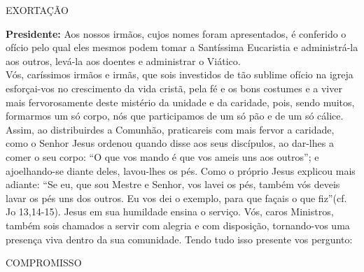 \documentclass{book}
\begin{document}
\begin{center}
    EXORTAÇÃO
    \vspace{.2cm} \\
\end{center}
\begin{flushleft}
    \textbf{Presidente:} Aos nossos irmãos, cujos nomes foram apresentados, é conferido o ofício pelo qual eles mesmos podem tomar a Santíssima Eucaristia e administrá-la aos outros, levá-la aos doentes e administrar o Viático.
    \vspace{.1cm} \\
    Vós, caríssimos irmãos e irmãs, que sois investidos de tão sublime ofício na igreja esforçai-vos no crescimento da vida cristã, pela fé e os bons costumes e a viver mais fervorosamente deste mistério da unidade e da caridade, pois, sendo muitos, formarmos um só corpo, nós que participamos de um só pão e de um só cálice.
    \vspace{.1cm} \\
    Assim, ao distribuirdes a Comunhão, praticareis com mais fervor a caridade, como o Senhor Jesus ordenou quando disse aos seus discípulos, ao dar-lhes a comer o seu corpo: ``O que vos mando é que vos ameis uns aos outros''; e ajoelhando-se diante deles, lavou-lhes os pés. Como o próprio Jesus explicou mais adiante: ``Se eu, que sou Mestre e Senhor, vos lavei os pés, também vós deveis lavar os pés uns dos outros. Eu vos dei o exemplo, para que façais o que fiz''(cf. Jo 13,14-15). Jesus em sua humildade ensina o serviço. Vós, caros Ministros, também sois chamados a servir com alegria e com disposição, tornando-vos uma presença viva dentro da sua comunidade. Tendo tudo isso presente vos pergunto:
    \vspace{.2cm} \\
\end{flushleft}
\begin{center}
    COMPROMISSO
    \vspace{.2cm} \\
\end{center}
\end{document}
